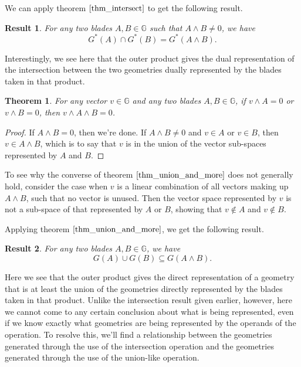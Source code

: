 \documentclass[12pt]{article}
\newcommand{\G}{\mathbb{G}}
\newtheorem{theorem}{Theorem}[section]
\newtheorem{result}{Result}[section]
\begin{document}
We can apply theorem $\eqref{thm_intersect}$ to get the following result.
\begin{result}\label{rslt_intersect}
For any two blades $A,B\in\G$ such that $A\wedge B\neq 0$, we have
\begin{equation*}
G^*(A)\cap G^*(B) = G^*(A\wedge B).
\end{equation*}
\end{result}
Interestingly, we see here that the outer product gives the
dual representation of the intersection between the two geometries
dually represented by the blades taken in that product.
\begin{theorem}\label{thm_union_and_more}
For any vector $v\in\G$ and any two blades $A,B\in\G$,
if $v\wedge A=0$ or $v\wedge B=0$, then $v\wedge A\wedge B=0$.
\end{theorem}
\begin{proof}
If $A\wedge B=0$, then we're done.  If $A\wedge B\neq 0$ and $v\in A$ or $v\in B$,
then $v\in A\wedge B$, which is to say that $v$ is in the union of the vector sub-spaces
represented by $A$ and $B$.
\end{proof}
To see why the converse of theorem $\eqref{thm_union_and_more}$ does not generally hold,
consider the case when $v$ is a linear combination of all vectors making up $A\wedge B$, such
that no vector is unused.
Then the vector space represented by $v$ is not a sub-space of that represented by $A$ or $B$,
showing that $v\not\in A$ and $v\not\in B$.

Applying theorem $\eqref{thm_union_and_more}$, we get the following result.
\begin{result}\label{rslt_union_and_more}
For any two blades $A,B\in\G$, we have
\begin{equation*}
G(A)\cup G(B)\subseteq G(A\wedge B).
\end{equation*}
\end{result}
Here we see that the outer product gives the direct representation
of a geometry that is at least the union of the geometries directly
represented by the blades taken in that product.  Unlike the intersection
result given earlier, however, here we cannot come to any certain conclusion
about what is being represented, even if we know exactly what
geometries are being represented by the operands of the operation.
To resolve this, we'll find a relationship between the geometries
generated through the use of the intersection operation and the geometries
generated through the use of the union-like operation.
\end{document}
